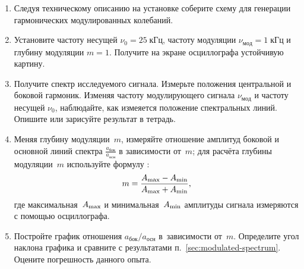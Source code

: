 \begin{lab:task}
\begin{enumerate}
\item Следуя техническому описанию на установке соберите схему для
генерации гармонических модулированных колебаний.

\item Установите частоту несущей $\nu_0=25\;кГц$, частоту модуляции
$\nu_{мод} = 1\;кГц$ и глубину модуляции $m=1$.
Получите на экране осциллографа устойчивую картину.

\item Получите спектр исследуемого сигнала. Измерьте положения центральной
и боковой гармоник. Изменяя частоту модулирующего сигнала $\nu_{мод}$
и частоту несущей $\nu_0$, наблюдайте, как измеяется положение спектральных линий.
Опишите или зарисуйте результат в тетрадь.

\item Меняя глубину модуляции~$m$, измеряйте отношение амплитуд
боковой и основной линий спектра $\frac{a_\text{бок}}{a_\text{осн}}$
в зависимости от~$m$;
для расчёта глубины модуляции~$m$ используйте формулу :
\[
    m = \frac{A_{\rm max} - A_{\rm min}}{A_{\rm max} + A_{\rm min}},
\]
где максимальная~$A_{\rm max}$ и минимальная~$A_{\rm min}$ амплитуды сигнала
измеряются с помощью осциллографа.

\item Постройте график отношения $a_\text{бок}/a_\text{осн}$
в~зависимости от~$m$. Определите угол наклона графика и сравните
с результатами п.~\ref{sec:modulated-spectrum}. Оцените погрешность данного опыта.
\end{enumerate}

\end{lab:task}





